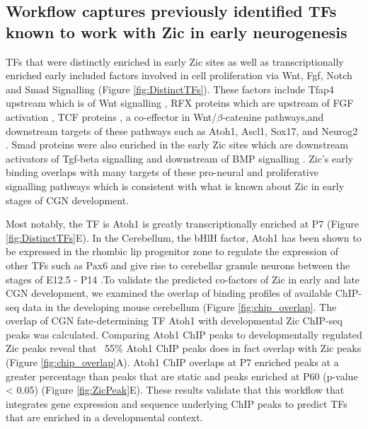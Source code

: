 \documentclass[fleqn,10pt,twocolumn]{wlscirep}
\begin{document}
\subsection*{Workflow captures previously identified TFs known to work with Zic in early neurogenesis}
TFs that were distinctly enriched in early Zic sites as well as transcriptionally enriched early included factors involved in cell proliferation via Wnt, Fgf, Notch and Smad Signalling (Figure \ref{fig:DistinctTFs}). These factors include Tfap4 upstream which is of Wnt signalling \cite{Martinez2020TheDevelopment, Song2018TranscriptionCarcinoma}, RFX proteins which are upstream of FGF activation \cite{Hsu2010RegulationRFX1}, TCF proteins \cite{Shy2013RegulationSignaling}, a co-effector in  Wnt/$\beta$-catenine pathways,and downstream targets of these pathways such as  Atoh1, Ascl1, Sox17, and Neurog2 \cite{Dennis2019BHLHReprogramming, Zhu2019pBCL11ACancer/p, Lacomme2012NEUROG2Cycle, Katoh2018MultilayeredReview, Lebensohn2016ComparativeSignaling}. Smad proteins were also enriched in the early Zic sites which are downstream activators of Tgf-beta signalling and downstream of BMP signalling \cite{Liu2021SMAD4Pathways, Nickel2019SpecificationSignaling, Derynck2003Smad-dependentSignalling}. Zic's early binding overlaps with many targets of these pro-neural and proliferative signalling pathways which is consistent with what is known about Zic in early stages of CGN development.

Most notably, the TF is Atoh1 is greatly transcriptionally enriched at P7 (Figure \ref{fig:DistinctTFs}E). In the Cerebellum, the bHlH factor, Atoh1 has been shown to be expressed in the rhombic lip progenitor zone to regulate the expression of other TFs such as Pax6 and give rise to cerebellar granule neurons between the stages of E12.5 - P14 \cite{Aruga2018ZicDisease, Yeung2014WlsDevelopment, Wang2005Math1Cerebellum, Ben-Arie1997Math1Neurons}.To validate the predicted co-factors of Zic in early and late CGN development, we examined the overlap of binding profiles of available ChIP-seq data in the developing mouse cerebellum  (Figure \ref{fig:chip_overlap}. The overlap of CGN fate-determining TF Atoh1 with developmental Zic ChIP-seq peaks was calculated. Comparing Atoh1 ChIP peaks to developmentally regulated Zic peaks reveal that ~55\%  Atoh1 ChIP peaks does in fact overlap with Zic peaks (Figure \ref{fig:chip_overlap}A). Atoh1 ChIP overlaps at P7 enriched peaks at a greater percentage than peaks that are static and peaks enriched at P60 (p-value < 0.05) (Figure \ref{fig:ZicPeak}E). These results validate that this workflow that integrates gene expression and sequence underlying ChIP peaks to predict TFs that are enriched in a developmental context.
\end{document}
